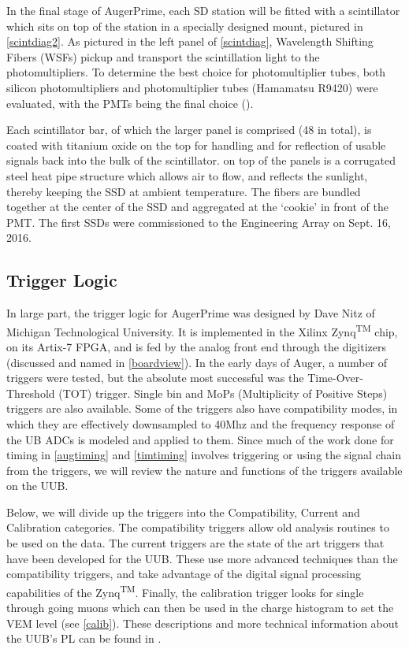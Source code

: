 In the final stage of AugerPrime, each SD station will be fitted with a scintillator which sits on top of the station in a specially designed mount, pictured in \autoref{scintdiag2}. As pictured in the left panel of \autoref{scintdiag}, Wavelength Shifting Fibers (WSFs) pickup and transport the scintillation light to the photomultipliers. To determine the best choice for photomultiplier tubes, both silicon photomultipliers and photomultiplier tubes (Hamamatsu R9420) were evaluated, with the PMTs being the final choice (\cite{augerscint,firstdat}). 

Each scintillator bar, of which the larger panel is comprised (48 in total), is coated with titanium oxide on the top for handling and for reflection of usable signals back into the bulk of the scintillator. on top of the panels is a corrugated steel heat pipe structure which allows air to flow, and reflects the sunlight, thereby keeping the SSD at ambient temperature. The fibers are bundled together at the center of the SSD and aggregated at the `cookie' in front of the PMT. The first SSDs were commissioned to the Engineering Array on Sept. 16, 2016.

\subsection{Trigger Logic}
In large part, the trigger logic for AugerPrime was designed by Dave Nitz of Michigan Technological University. It is implemented in the Xilinx Zynq\textsuperscript{TM} chip, on its Artix-7 FPGA, and is fed by the analog front end through the digitizers (discussed and named in \autoref{boardview}). In the early days of Auger, a number of triggers were tested, but the absolute most successful was the Time-Over-Threshold (TOT) trigger. Single bin and MoPs (Multiplicity of Positive Steps) triggers are also available. Some of the triggers also have compatibility modes, in which they are effectively downsampled to 40Mhz and the frequency response of the UB ADCs is modeled and applied to them. Since much of the work done for timing in \autoref{augtiming} and \autoref{timtiming} involves triggering or using the signal chain from the triggers, we will review the nature and functions of the triggers available on the UUB.

Below, we will divide up the triggers into the Compatibility, Current and Calibration categories. The compatibility triggers allow old analysis routines to be used on the data. The current triggers are the state of the art triggers that have been developed for the UUB. These use more advanced techniques than the compatibility triggers, and take advantage of the digital signal processing capabilities of the Zynq\textsuperscript{TM}. Finally, the calibration trigger looks for single through going muons which can then be used in the charge histogram to set the VEM level (see \autoref{calib}). These descriptions and more technical information about the UUB's PL can be found in \textcite{triggers}.

